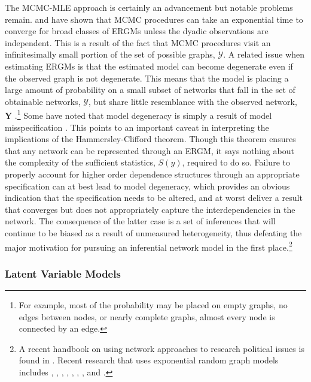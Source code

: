 The MCMC-MLE approach is certainly an advancement but notable problems remain. \citet{bhamidi:etal:2008} and \citet{chatterjee:diaconis:2013} have shown that MCMC procedures can take an exponential time to converge for broad classes of ERGMs unless the dyadic observations are independent. This is a result of the fact that MCMC procedures visit an infinitesimally small portion of the set of possible graphs, $\mathcal{Y}$. A related issue when estimating ERGMs is that the estimated model can become degenerate even if the observed graph is not degenerate. This means that the model is placing a large amount of probability on a small subset of networks that fall in the set of obtainable networks, $\mathcal{Y}$, but share little resemblance with the observed network, $\mathbf{Y}$ \citep{schweinberger:2011}.\footnote{For example, most of the probability may be placed on empty graphs, no edges between nodes, or nearly complete graphs, almost every node is connected by an edge.} Some have noted that model degeneracy is simply a result of model misspecification \citep{handcock:2003b,goodreau:etal:2008,handcock:etal:2008}. This points to an important caveat in interpreting the implications of the Hammersley-Clifford theorem. Though this theorem ensures that any network can be represented through an ERGM, it says nothing about the complexity of the sufficient statistics, $S(y)$, required to do so. Failure to properly account for higher order dependence structures through an appropriate specification can at best lead to model degeneracy, which provides an obvious indication that the specification needs to be altered, and at worst deliver a result that converges but does not appropriately capture the interdependencies in the network. The consequence of the latter case is a set of inferences that will continue to be biased as a result of unmeasured heterogeneity, thus defeating the major motivation for pursuing an inferential network model in the first place.\footnote{A recent handbook on using network approaches to research political issues is found in \citet{victor:etal:2016}.  Recent research that uses exponential random graph models includes \citet{victor:ringe:2009}, \citet{berardo:scholz:2010}, \citet{calvo:leiras:2012}, \citet{lubell:etal:2012}, \citet{robbins:etal:2012}, \citet{aleman:calvo:2013}, \citet{heaney:2014}, and \citet{kirkland:williams:2014}.}

\subsubsection{\textbf{Latent Variable Models}}


